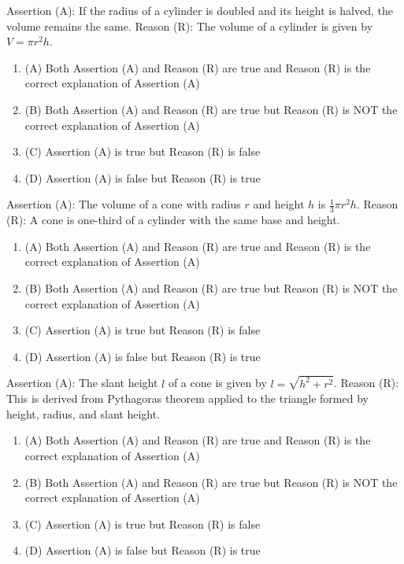 \documentclass[12pt,a4paper]{exam}
\begin{document}
\begin{questions}
\question[1] Assertion (A): If the radius of a cylinder is doubled and its height is halved, the volume remains the same. Reason (R): The volume of a cylinder is given by $V = \pi r^2 h$.
\begin{enumerate}[label=(\Alph*)]
  \item (A) Both Assertion (A) and Reason (R) are true and Reason (R) is the correct explanation of Assertion (A)
  \item (B) Both Assertion (A) and Reason (R) are true but Reason (R) is NOT the correct explanation of Assertion (A)
  \item (C) Assertion (A) is true but Reason (R) is false
  \item (D) Assertion (A) is false but Reason (R) is true
\end{enumerate}
\vspace{0.15cm}

\question[1] Assertion (A): The volume of a cone with radius $r$ and height $h$ is $\frac{1}{3}\pi r^2 h$. Reason (R): A cone is one-third of a cylinder with the same base and height.
\begin{enumerate}[label=(\Alph*)]
  \item (A) Both Assertion (A) and Reason (R) are true and Reason (R) is the correct explanation of Assertion (A)
  \item (B) Both Assertion (A) and Reason (R) are true but Reason (R) is NOT the correct explanation of Assertion (A)
  \item (C) Assertion (A) is true but Reason (R) is false
  \item (D) Assertion (A) is false but Reason (R) is true
\end{enumerate}
\vspace{0.15cm}

\question[1] Assertion (A): The slant height $l$ of a cone is given by $l = \sqrt{h^2 + r^2}$. Reason (R): This is derived from Pythagoras theorem applied to the triangle formed by height, radius, and slant height.
\begin{enumerate}[label=(\Alph*)]
  \item (A) Both Assertion (A) and Reason (R) are true and Reason (R) is the correct explanation of Assertion (A)
  \item (B) Both Assertion (A) and Reason (R) are true but Reason (R) is NOT the correct explanation of Assertion (A)
  \item (C) Assertion (A) is true but Reason (R) is false
  \item (D) Assertion (A) is false but Reason (R) is true
\end{enumerate}
\vspace{0.15cm}


\end{questions}
\end{document}
